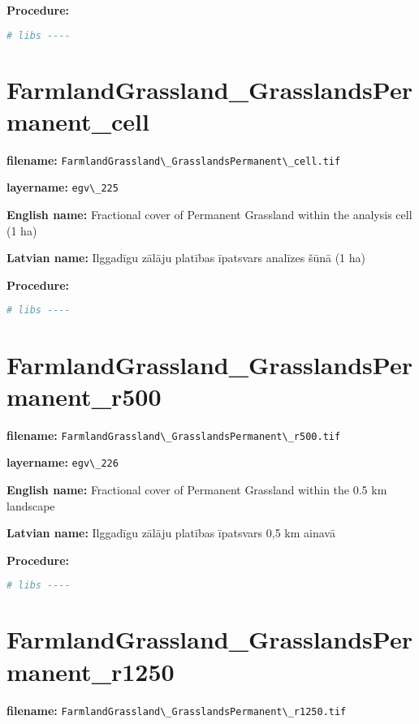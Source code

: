 \documentclass[
]{book}
\newcommand{\passthrough}[1]{#1}
\begin{document}
\textbf{Procedure:}

\begin{lstlisting}[language=R]
# libs ----
\end{lstlisting}

\section{FarmlandGrassland\_GrasslandsPermanent\_cell}\label{ch06.225}

\textbf{filename:} \passthrough{\lstinline!FarmlandGrassland\_GrasslandsPermanent\_cell.tif!}

\textbf{layername:} \passthrough{\lstinline!egv\_225!}

\textbf{English name:} Fractional cover of Permanent Grassland within the analysis cell (1 ha)

\textbf{Latvian name:} Ilggadīgu zālāju platības īpatsvars analīzes šūnā (1 ha)

\textbf{Procedure:}

\begin{lstlisting}[language=R]
# libs ----
\end{lstlisting}

\section{FarmlandGrassland\_GrasslandsPermanent\_r500}\label{ch06.226}

\textbf{filename:} \passthrough{\lstinline!FarmlandGrassland\_GrasslandsPermanent\_r500.tif!}

\textbf{layername:} \passthrough{\lstinline!egv\_226!}

\textbf{English name:} Fractional cover of Permanent Grassland within the 0.5 km landscape

\textbf{Latvian name:} Ilggadīgu zālāju platības īpatsvars 0,5 km ainavā

\textbf{Procedure:}

\begin{lstlisting}[language=R]
# libs ----
\end{lstlisting}

\section{FarmlandGrassland\_GrasslandsPermanent\_r1250}\label{ch06.227}

\textbf{filename:} \passthrough{\lstinline!FarmlandGrassland\_GrasslandsPermanent\_r1250.tif!}
\end{document}
